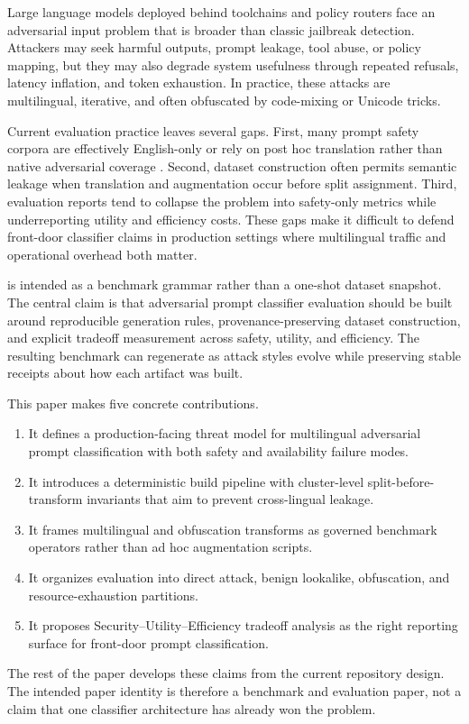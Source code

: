 Large language models deployed behind toolchains and policy routers face an adversarial input problem that is broader than classic jailbreak detection. Attackers may seek harmful outputs, prompt leakage, tool abuse, or policy mapping, but they may also degrade system usefulness through repeated refusals, latency inflation, and token exhaustion. In practice, these attacks are multilingual, iterative, and often obfuscated by code-mixing or Unicode tricks.

Current evaluation practice leaves several gaps. First, many prompt safety corpora are effectively English-only or rely on post hoc translation rather than native adversarial coverage \citep{wildjailbreak2024,ayaredteaming2024,xsafety2024}. Second, dataset construction often permits semantic leakage when translation and augmentation occur before split assignment. Third, evaluation reports tend to collapse the problem into safety-only metrics while underreporting utility and efficiency costs. These gaps make it difficult to defend front-door classifier claims in production settings where multilingual traffic and operational overhead both matter.

\system is intended as a benchmark grammar rather than a one-shot dataset snapshot. The central claim is that adversarial prompt classifier evaluation should be built around reproducible generation rules, provenance-preserving dataset construction, and explicit tradeoff measurement across safety, utility, and efficiency. The resulting benchmark can regenerate as attack styles evolve while preserving stable receipts about how each artifact was built.

This paper makes five concrete contributions.

\begin{enumerate}[leftmargin=1.5em]
  \item It defines a production-facing threat model for multilingual adversarial prompt classification with both safety and availability failure modes.
  \item It introduces a deterministic build pipeline with cluster-level split-before-transform invariants that aim to prevent cross-lingual leakage.
  \item It frames multilingual and obfuscation transforms as governed benchmark operators rather than ad hoc augmentation scripts.
  \item It organizes evaluation into direct attack, benign lookalike, obfuscation, and resource-exhaustion partitions.
  \item It proposes Security--Utility--Efficiency tradeoff analysis as the right reporting surface for front-door prompt classification.
\end{enumerate}

The rest of the paper develops these claims from the current repository design. The intended paper identity is therefore a benchmark and evaluation paper, not a claim that one classifier architecture has already won the problem.
